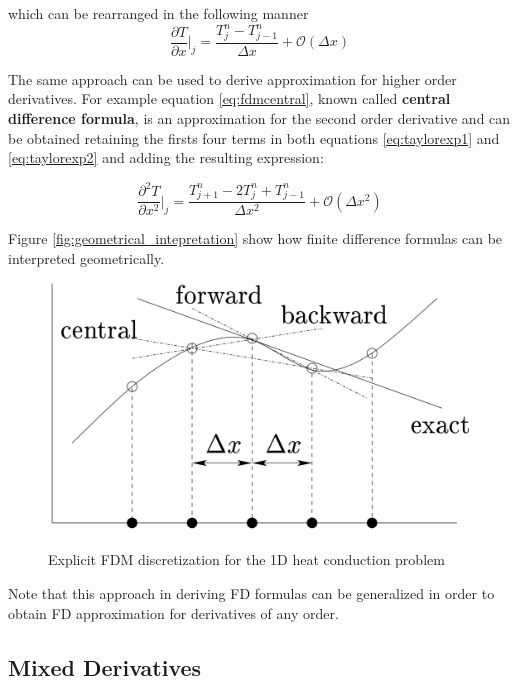     which can be rearranged in the following manner
        \begin{equation}
    \frac{\partial T}{\partial x}\bigg\rvert_j  = \frac{T^n_{j} - T^n_{j-1}}{\Delta x} + \mathcal{O}(\Delta x)
    \label{eq:fdmfbackward}
    \end{equation}
    
   The same approach can be used to derive approximation for higher order derivatives.
   For example equation \ref{eq:fdmcentral}, known called \textbf{central difference formula}, is an approximation for the second order derivative and can be obtained retaining the firsts four terms in both equations \ref{eq:taylorexp1} and \ref{eq:taylorexp2} and adding the resulting expression:
   
    \begin{equation}
		\frac{\partial^2 T}{\partial x^2}\bigg\rvert_j = \frac{T^n_{j+1}- 2T^n_{j} + T^n_{j-1}}{\Delta x^2} + \mathcal{O}(\Delta x^2)
		\label{eq:fdmcentral}
    \end{equation}
    
    Figure \ref{fig:geometrical_intepretation} show how finite difference formulas can be interpreted geometrically.
\begin{figure}
	\centering
	\includegraphics[scale=0.3]{./images/CA_FDM/geometrical_interpretation_fd}
	\label{fig:geometrical_intepretation}
	\caption{Explicit FDM discretization for the 1D heat conduction problem}\label{torus}
\end{figure} 
    
Note that this approach in deriving FD formulas can be generalized in order to obtain FD approximation for derivatives of any order.

 \subsection{Mixed Derivatives}

